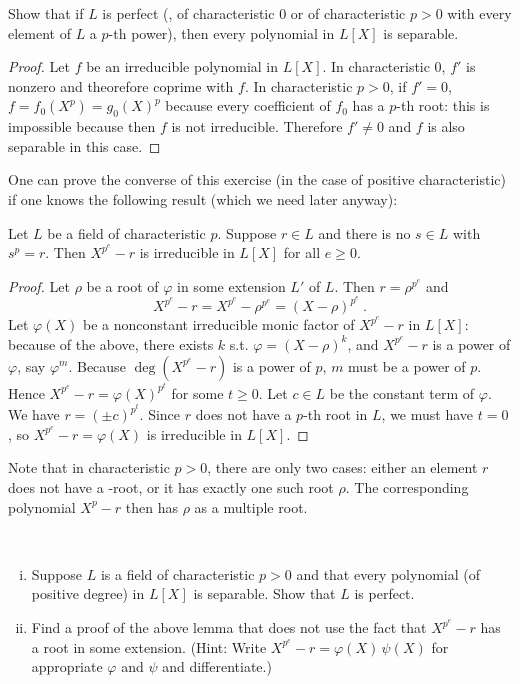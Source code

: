 \begin{exo}
\label{e2.3.2}
Show that if $L$ is perfect (\ie, of characteristic 0 or of characteristic $p>0$ with every element of $L$ a $p$-th power), then every polynomial in $L[X]$ is separable.
\end{exo}


\begin{proof}
Let $f$ be an irreducible polynomial in $L[X]$. In characteristic 0, $f'$ is nonzero and theorefore coprime with $f$. In characteristic $p>0$, if $f'=0$, $f=f_0(X^p)=g_0(X)^p$ because every coefficient of $f_0$ has a $p$-th root: this is impossible because then $f$ is not irreducible. Therefore $f'\neq 0$ and $f$ is also separable in this case.
\end{proof}

One can prove the converse of this exercise (in the case of positive characteristic) if one knows the following result (which we need later anyway):

\begin{lem}
\label{l2.3.2}
Let $L$ be a field of characteristic $p$. Suppose $r\in L$ and there is no $s\in L$ with $s^{p}=r$. Then $X^{p^{e}}-r$ is irreducible in $L[X]$ for all $e\geq 0$.
\end{lem}

\begin{proof}
Let $\rho$ be a root of $\varphi$ in some extension $L'$ of $L$. Then $r=\rho^{p^e}$ and
$$
X^{p^e}-r=X^{p^e} - {\rho}^{p^e} = (X-\rho)^{p^e}\ .
$$
Let $\varphi(X)$ be a nonconstant irreducible monic factor of $X^{p^e}-r$ in $L[X]$: because of the above, there exists $k$ s.t. $\varphi = (X-\rho)^k$, and $X^{p^e}-r$ is a power of $\varphi$, say $\varphi^m$. Because $\deg(X^{p^e}-r)$ is a power of $p$, $m$ must be a power of $p$. Hence $X^{p^e}-r=\varphi(X)^{p^{t}}$ for some $t\geq 0$. Let $c\in L$ be the constant term of $\varphi$. We have $r=(\pm c)^{p^{t}}$. Since $r$ does not have a $p$-th root in $L$, we must have $t =0$, so $X^{p^e}-r=\varphi(X)$ is irreducible in $L[X]$.
\end{proof}

Note that in characteristic $p>0$, there are only two cases: either an element $r$ does not have a -root, or it has exactly one such root $\rho$. The corresponding polynomial $X^p - r$ then has $\rho$ as a multiple root.

\begin{exo}
\label{e2.3.3}
~
\begin{enumerate}[(i)]
\item
Suppose $L$ is a field of characteristic $p>0$ and that every polynomial (of positive degree) in $L[X]$ is separable. Show that $L$ is perfect.
\item
Find a proof of the above lemma that does not use the fact that $X^{p^{e}}-r$ has a root in some extension. (Hint: Write
$X^{p^{e}}-r=\varphi(X)\, \psi(X)$ for appropriate $\varphi$ and $\psi$ and differentiate.)
\end{enumerate}
\end{exo}

